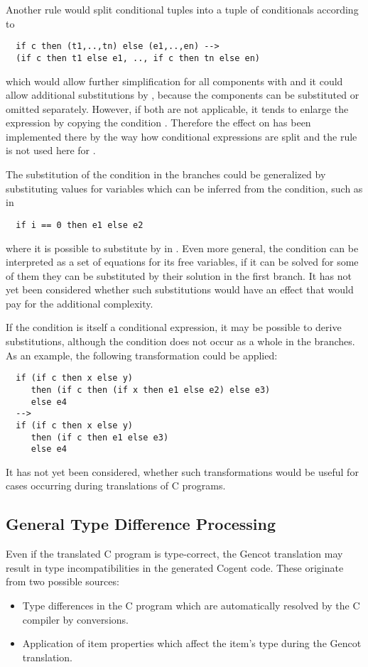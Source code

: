Another rule would split conditional tuples into a tuple of conditionals according to
\begin{verbatim}
  if c then (t1,..,tn) else (e1,..,en) --> 
  (if c then t1 else e1, .., if c then tn else en)
\end{verbatim}
which would allow further simplification for all components with  and it could allow additional substitutions
by , because the components can be substituted or omitted separately. However, if both are not applicable, it 
tends to enlarge the expression by copying the condition . Therefore the effect on  has been implemented
there by the way how conditional expressions are split and the rule is not used here for .

The substitution of the condition in the branches could be generalized by substituting values for variables which can be
inferred from the condition, such as in
\begin{verbatim}
  if i == 0 then e1 else e2
\end{verbatim}
where it is possible to substitute  by  in . Even more general, the condition can be interpreted as
a set of equations for its free variables, if it can be solved for some of them they can be substituted by their solution
in the first branch. It has not yet been considered whether such substitutions would have an effect that would pay for the 
additional complexity.

If the condition is itself a conditional expression, it may be possible to derive substitutions, although the condition does
not occur as a whole in the branches. As an example, the following transformation could be applied:
\begin{verbatim}
  if (if c then x else y) 
     then (if c then (if x then e1 else e2) else e3) 
     else e4 
  -->
  if (if c then x else y) 
     then (if c then e1 else e3)
     else e4
\end{verbatim}
It has not yet been considered, whether such transformations would be useful for cases occurring during translations of C programs.

\subsection{General Type Difference Processing}
\label{impl-post-types}

Even if the translated C program is type-correct, the Gencot translation may result in type incompatibilities in the generated
Cogent code. These originate from two possible sources:
\begin{itemize}
\item Type differences in the C program which are automatically resolved by the C compiler by conversions.
\item Application of item properties which affect the item's type during the Gencot translation.
\end{itemize}


